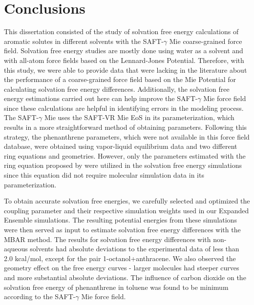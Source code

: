 \chapter{Conclusions} %

\label{Chapter6} 

This dissertation consisted of the study of solvation free energy calculations of aromatic solutes in different solvents with the SAFT-$\gamma$ Mie coarse-grained force field. Solvation free energy studies are mostly done using water as a solvent and with all-atom force fields based on the Lennard-Jones Potential. Therefore, with this study, we were able to provide data that were lacking in the literature about the performance of a coarse-grained force field based on the Mie Potential for calculating solvation free energy differences. Additionally, the solvation free energy estimations carried out here can help improve the SAFT-$\gamma$  Mie force field since these calculations are helpful in identifying errors in the modeling process. The SAFT-$\gamma$ Mie uses the SAFT-VR Mie EoS in its parameterization, which results in a more straightforward method of obtaining parameters. Following this strategy, the phenanthrene parameters, which were not available in this force field database, were obtained using vapor-liquid equilibrium data and two different ring equations and geometries. However, only the parameters estimated with the ring equation proposed by  were utilized in the solvation free energy simulations since this equation did not require molecular simulation data in its parameterization.

To obtain accurate solvation free energies, we carefully selected and optimized the coupling parameter and their respective simulation weights used in our Expanded Ensemble simulations. The resulting potential energies from these simulations were then served as input to estimate solvation free energy differences with the MBAR method. The results for solvation free energy differences with non-aqueous solvents had absolute deviations to the experimental
data of less than 2.0 kcal/mol, except for the pair 1-octanol+anthracene. We also observed the geometry effect on the free energy curves - larger molecules had steeper curves and more substantial absolute deviations. The influence of carbon dioxide on the solvation free energy of phenanthrene in toluene was found to be minimum according to the SAFT-$\gamma$ Mie force field. 

